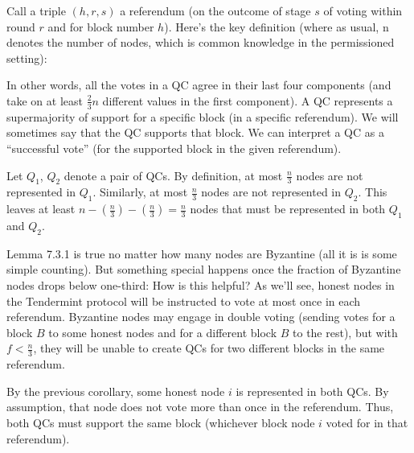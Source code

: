  {
Call a triple $(h, r, s)$ a referendum (on the outcome of stage $s$ of voting
within round $r$ and for block number $h$). Here’s the key definition (where as usual, n denotes
the number of nodes, which is common knowledge in the permissioned setting):}

In other words, all the votes in a QC agree in their last four components (and take on at
least $\frac{2}{3}n$ different values in the first component). A QC represents a supermajority of support
for a specific block (in a specific referendum). We will sometimes say that the QC supports 
that block. We can interpret a QC as a “successful vote” (for the supported block in the
given referendum).


\begin{myproof}
Let $Q_1$, $Q_2$ denote a pair of QCs. By definition, at most $\frac{n}{3}$ nodes are not represented
in $Q_1$. Similarly, at most $\frac{n}{3}$ nodes are not represented in $Q_2$. This leaves at least $n-(\frac{n}{3})-(\frac{n}{3}) = \frac{n}{3}$ nodes that must be represented in both $Q_1$ and $Q_2$.
\end{myproof}
Lemma 7.3.1 is true no matter how many nodes are Byzantine (all it is is some simple
counting). But something special happens once the fraction of Byzantine nodes drops below
one-third:
How is this helpful? As we’ll see, honest nodes in the Tendermint protocol will be
instructed to vote at most once in each referendum. Byzantine nodes may engage in double voting (sending votes for a block $B$ to some honest nodes and for a different block $B$
to the rest), but with $f < \frac{n}{3}$, they will be unable to create QCs for two different blocks in the same referendum.\\

\begin{myproof}
By the previous corollary, some honest node $i$ is represented in both QCs. By
assumption, that node does not vote more than once in the referendum. Thus, both QCs
must support the same block (whichever block node $i$ voted for in that referendum).
\end{myproof} \\

